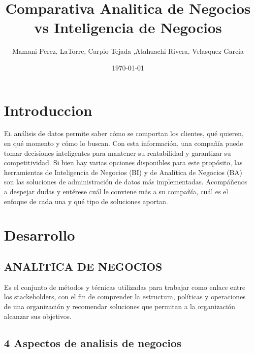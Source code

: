 \documentclass[twoside,twocolumn]{article}
\title{Comparativa Analitica de Negocios vs Inteligencia de Negocios} %
\author{Mamani Perez, LaTorre, Carpio Tejada ,Atahuachi Rivera, Velasquez Garcia}
\date{\today} %
\begin{document}
\maketitle


\section{Introduccion}

\lettrine[nindent=0em,lines=2]{E}l análisis de datos permite saber cómo se comportan los clientes, qué quieren, en qué momento y cómo lo buscan. Con esta información, una compañía puede tomar decisiones inteligentes para mantener su rentabilidad y garantizar su competitividad. Si bien hay varias opciones disponibles para este propósito, las herramientas de Inteligencia de Negocios (BI) y de Analítica de Negocios (BA) son las soluciones de administración de datos más implementadas. Acompáñenos a despejar dudas y entérese cuál le conviene más a su compañía, cuál es el enfoque de cada una y qué tipo de soluciones aportan. 




\section{Desarrollo}

\subsection{ANALITICA DE NEGOCIOS}
Es el conjunto de métodos y técnicas utilizadas para trabajar como enlace entre los stackeholders, con el fin de comprender la estructura, políticas y operaciones de una organización y recomendar soluciones que permitan a la organización alcanzar sus objetivos.
 
\subsection{4  Aspectos de analisis de negocios}
\end{document}
